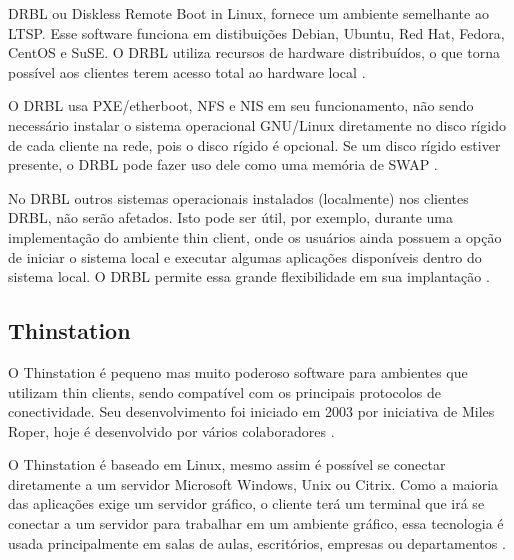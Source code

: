\documentclass[
	12pt,				%
	openright,			%
	twoside,			%
	a4paper,			%
	chapter=TITLE,		%
	english,			%
	brazil				%
	]{abntex2}
\begin{document}
DRBL ou Diskless Remote Boot in Linux, fornece um ambiente semelhante ao LTSP. Esse software funciona em distibuições Debian, Ubuntu, Red Hat, Fedora, CentOS e SuSE. O DRBL utiliza recursos de hardware distribuídos, o que torna possível aos clientes terem acesso total ao hardware local \cite{drbl}.

O DRBL usa PXE/etherboot, NFS e NIS em seu funcionamento, não sendo necessário instalar o sistema operacional GNU/Linux diretamente no disco rígido de cada cliente na rede, pois o disco rígido é opcional. Se um disco rígido estiver presente, o DRBL pode fazer uso dele como uma memória de SWAP \cite{drbl,piaui,Frank.drbl}.

No DRBL outros sistemas operacionais instalados (localmente) nos clientes DRBL, não serão afetados. Isto pode ser útil, por exemplo, durante uma implementação do ambiente thin client, onde os usuários ainda possuem a opção de iniciar o sistema local e executar algumas aplicações disponíveis dentro do sistema local. O DRBL permite essa grande flexibilidade em sua implantação \cite{drbl}.







\subsection{Thinstation}

O Thinstation é pequeno mas muito poderoso software para ambientes que utilizam thin clients, sendo compatível com os principais protocolos de conectividade. Seu desenvolvimento foi iniciado em 2003 por iniciativa de Miles Roper, hoje é desenvolvido por vários colaboradores \cite{Thinstationl,piaui}.

O Thinstation é baseado em Linux, mesmo assim é possível se conectar diretamente a um servidor Microsoft Windows, Unix ou Citrix. Como a maioria das aplicações exige um servidor gráfico, o cliente terá um terminal que irá se conectar a um servidor para trabalhar em um ambiente gráfico, essa tecnologia é usada principalmente em salas de aulas, escritórios, empresas ou departamentos \cite{Thinstationl}.
\end{document}
